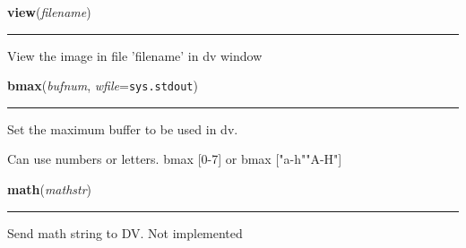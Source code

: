     \label{dv:view}

    \vspace{0.5ex}

    \begin{boxedminipage}{\textwidth}

    \raggedright \textbf{view}(\textit{filename})

    \vspace{-1.5ex}

    \rule{\textwidth}{0.5\fboxrule}
    View the image in file 'filename' in dv window

    \vspace{1ex}

    \end{boxedminipage}

    \label{dv:bmax}

    \vspace{0.5ex}

    \begin{boxedminipage}{\textwidth}

    \raggedright \textbf{bmax}(\textit{bufnum}, \textit{wfile}=\texttt{sys.stdout})

    \vspace{-1.5ex}

    \rule{\textwidth}{0.5\fboxrule}
    Set the maximum buffer to be used in dv.

    Can use numbers or letters. bmax [0-7] or bmax ["a-h"{\textbar}"A-H"]

    \vspace{1ex}

    \end{boxedminipage}

    \label{dv:math}

    \vspace{0.5ex}

    \begin{boxedminipage}{\textwidth}

    \raggedright \textbf{math}(\textit{mathstr})

    \vspace{-1.5ex}

    \rule{\textwidth}{0.5\fboxrule}
    Send math string to DV. Not implemented

    \vspace{1ex}

    \end{boxedminipage}

